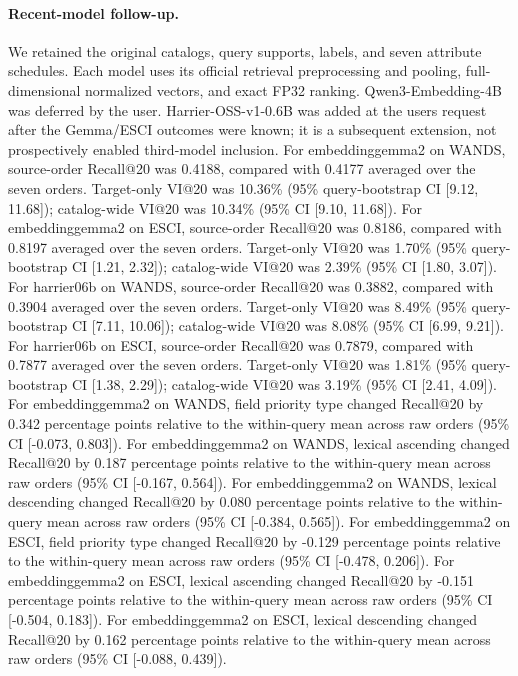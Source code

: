 \paragraph{Recent-model follow-up.} We retained the original catalogs, query supports, labels, and seven attribute schedules. Each model uses its official retrieval preprocessing and pooling, full-dimensional normalized vectors, and exact FP32 ranking. Qwen3-Embedding-4B was deferred by the user. Harrier-OSS-v1-0.6B was added at the user\textquotesingle s request after the Gemma/ESCI outcomes were known; it is a subsequent extension, not prospectively enabled third-model inclusion.
For embeddinggemma2 on WANDS, source-order Recall@20 was 0.4188, compared with 0.4177 averaged over the seven orders. Target-only VI@20 was 10.36\% (95\% query-bootstrap CI [9.12, 11.68]); catalog-wide VI@20 was 10.34\% (95\% CI [9.10, 11.68]).
For embeddinggemma2 on ESCI, source-order Recall@20 was 0.8186, compared with 0.8197 averaged over the seven orders. Target-only VI@20 was 1.70\% (95\% query-bootstrap CI [1.21, 2.32]); catalog-wide VI@20 was 2.39\% (95\% CI [1.80, 3.07]).
For harrier06b on WANDS, source-order Recall@20 was 0.3882, compared with 0.3904 averaged over the seven orders. Target-only VI@20 was 8.49\% (95\% query-bootstrap CI [7.11, 10.06]); catalog-wide VI@20 was 8.08\% (95\% CI [6.99, 9.21]).
For harrier06b on ESCI, source-order Recall@20 was 0.7879, compared with 0.7877 averaged over the seven orders. Target-only VI@20 was 1.81\% (95\% query-bootstrap CI [1.38, 2.29]); catalog-wide VI@20 was 3.19\% (95\% CI [2.41, 4.09]).
For embeddinggemma2 on WANDS, field priority type changed Recall@20 by 0.342 percentage points relative to the within-query mean across raw orders (95\% CI [-0.073, 0.803]).
For embeddinggemma2 on WANDS, lexical ascending changed Recall@20 by 0.187 percentage points relative to the within-query mean across raw orders (95\% CI [-0.167, 0.564]).
For embeddinggemma2 on WANDS, lexical descending changed Recall@20 by 0.080 percentage points relative to the within-query mean across raw orders (95\% CI [-0.384, 0.565]).
For embeddinggemma2 on ESCI, field priority type changed Recall@20 by -0.129 percentage points relative to the within-query mean across raw orders (95\% CI [-0.478, 0.206]).
For embeddinggemma2 on ESCI, lexical ascending changed Recall@20 by -0.151 percentage points relative to the within-query mean across raw orders (95\% CI [-0.504, 0.183]).
For embeddinggemma2 on ESCI, lexical descending changed Recall@20 by 0.162 percentage points relative to the within-query mean across raw orders (95\% CI [-0.088, 0.439]).
